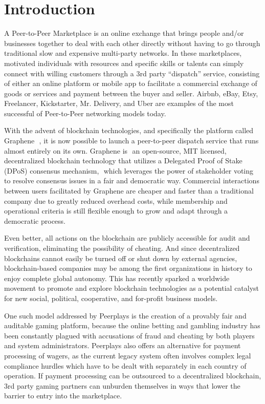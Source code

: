 \documentclass[a4paper,titlepage,final]{article}
\begin{document}
\tableofcontents

\newpage

\section{Introduction}

A Peer-to-Peer Marketplace is an online exchange that brings people and/or businesses together to deal with each other directly without having to go through traditional slow and expensive multi-party networks. In these marketplaces, motivated individuals with resources and specific skills or talents can simply connect with willing customers through a 3rd party “dispatch” service, consisting of either an online platform or mobile app to facilitate a commercial exchange of goods or services and payment between the buyer and seller. Airbnb, eBay, Etsy, Freelancer, Kickstarter, Mr. Delivery, and Uber are examples of the most successful of Peer-to-Peer networking models today.

With the advent of blockchain technologies, and specifically the platform called ​ Graphene ​ , it is now possible to launch a peer-to-peer dispatch service that runs almost entirely on its own. Graphene is ​ an open-source, MIT licensed, decentralized blockchain technology that utilizes a Delegated Proof of Stake (DPoS) consensus mechanism, ​ which leverages the power of stakeholder voting to resolve consensus issues in a fair and democratic way. Commercial interactions between users facilitated by Graphene are cheaper and faster than a traditional company due to greatly reduced overhead costs, while membership and operational criteria is still flexible enough to grow and adapt through a democratic process. 

Even better, all actions on the blockchain are publicly accessible for audit and verification, eliminating the possibility of cheating. And since decentralized blockchains cannot easily be turned off or shut down by external agencies, blockchain-based companies may be among the first organizations in history to enjoy complete global autonomy. This has recently sparked a worldwide movement to promote and explore blockchain technologies as a potential catalyst for new social, political, cooperative, and for-profit business models. 

One such model addressed by Peerplays is the creation of a provably fair and auditable gaming platform, because the online betting and gambling industry has been constantly plagued with accusations of fraud and cheating by both players and system administrators.\cite{1}​ Peerplays also offers an alternative for payment processing of wagers, as the current legacy system often involves complex legal compliance hurdles which have to be dealt with separately in each country of operation.\cite{2}​ If payment processing can be outsourced to a decentralized blockchain, 3rd party gaming partners can unburden themselves in ways that lower the barrier to entry into the marketplace.
\end{document}
